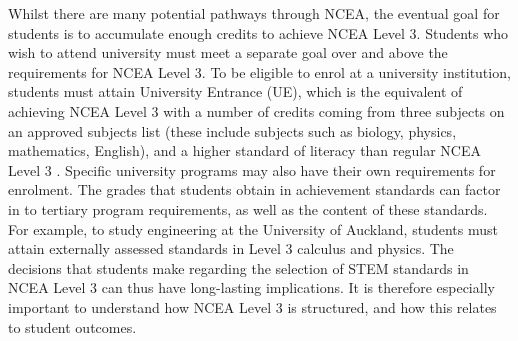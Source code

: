 Whilst there are many potential pathways through NCEA, the eventual goal for students is to accumulate enough credits to achieve NCEA Level 3. Students who wish to attend university must meet a separate goal over and above the requirements for NCEA Level 3. To be eligible to enrol at a university institution, students must attain University Entrance (UE), which is the equivalent of achieving NCEA Level 3 with a number of credits coming from three subjects on an approved subjects list (these include subjects such as biology, physics, mathematics, English), and a higher standard of literacy than regular NCEA Level 3 \citep{hipkins2016ncea}. Specific university programs may also have their own requirements for enrolment. The grades that students obtain in achievement standards can factor in to tertiary program requirements, as well as the content of these standards. For example, to study engineering at the University of Auckland, students must attain externally assessed standards in Level 3 calculus and physics. The decisions that students make regarding the selection of STEM standards in NCEA Level 3 can thus have long-lasting implications. It is therefore especially important to understand how NCEA Level 3 is structured, and how this relates to student outcomes.  

